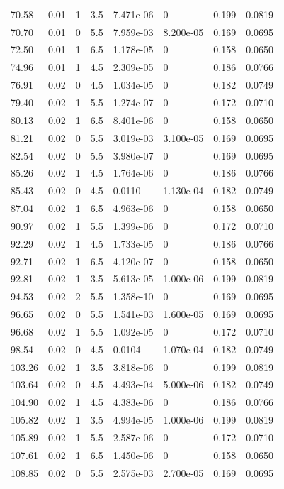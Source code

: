 \documentclass[preview]{standalone}
\begin{document}
{{{\begin{tabular}{L{1.2cm}C{1.2cm} C{0.3cm}C{0.5cm} C{1.4cm}C{1.4cm} C{1.4cm}C{1.4cm}}
  70.58  &  0.01  & 1     & 3.5 &  7.471e-06  & 0  & 0.199 &  0.0819   \\ 
  70.70  &  0.01  & 0     & 5.5 &  7.959e-03  & 8.200e-05  & 0.169 &  0.0695   \\ 
  72.50  &  0.01  & 1     & 6.5 &  1.178e-05  & 0  & 0.158 &  0.0650   \\ 
  74.96  &  0.01  & 1     & 4.5 &  2.309e-05  & 0  & 0.186 &  0.0766   \\ 
  76.91  &  0.02  & 0     & 4.5 &  1.034e-05  & 0  & 0.182 &  0.0749   \\ 
  79.40  &  0.02  & 1     & 5.5 &  1.274e-07  & 0  & 0.172 &  0.0710   \\ 
  80.13  &  0.02  & 1     & 6.5 &  8.401e-06  & 0  & 0.158 &  0.0650   \\ 
  81.21  &  0.02  & 0     & 5.5 &  3.019e-03  & 3.100e-05  & 0.169 &  0.0695   \\ 
  82.54  &  0.02  & 0     & 5.5 &  3.980e-07  & 0  & 0.169 &  0.0695   \\ 
  85.26  &  0.02  & 1     & 4.5 &  1.764e-06  & 0  & 0.186 &  0.0766   \\ 
  85.43  &  0.02  & 0     & 4.5 &  0.0110  & 1.130e-04  & 0.182 &  0.0749   \\ 
  87.04  &  0.02  & 1     & 6.5 &  4.963e-06  & 0  & 0.158 &  0.0650   \\ 
  90.97  &  0.02  & 1     & 5.5 &  1.399e-06  & 0  & 0.172 &  0.0710   \\ 
  92.29  &  0.02  & 1     & 4.5 &  1.733e-05  & 0  & 0.186 &  0.0766   \\ 
  92.71  &  0.02  & 1     & 6.5 &  4.120e-07  & 0  & 0.158 &  0.0650   \\ 
  92.81  &  0.02  & 1     & 3.5 &  5.613e-05  & 1.000e-06  & 0.199 &  0.0819   \\ 
  94.53  &  0.02  & 2     & 5.5 &  1.358e-10  & 0  & 0.169 &  0.0695   \\ 
  96.65  &  0.02  & 0     & 5.5 &  1.541e-03  & 1.600e-05  & 0.169 &  0.0695   \\ 
  96.68  &  0.02  & 1     & 5.5 &  1.092e-05  & 0  & 0.172 &  0.0710   \\ 
  98.54  &  0.02  & 0     & 4.5 &  0.0104  & 1.070e-04  & 0.182 &  0.0749   \\ 
  103.26  &  0.02  & 1     & 3.5 &  3.818e-06  & 0  & 0.199 &  0.0819   \\ 
  103.64  &  0.02  & 0     & 4.5 &  4.493e-04  & 5.000e-06  & 0.182 &  0.0749   \\ 
  104.90  &  0.02  & 1     & 4.5 &  4.383e-06  & 0  & 0.186 &  0.0766   \\ 
  105.82  &  0.02  & 1     & 3.5 &  4.994e-05  & 1.000e-06  & 0.199 &  0.0819   \\ 
  105.89  &  0.02  & 1     & 5.5 &  2.587e-06  & 0  & 0.172 &  0.0710   \\ 
  107.61  &  0.02  & 1     & 6.5 &  1.450e-06  & 0  & 0.158 &  0.0650   \\ 
  108.85  &  0.02  & 0     & 5.5 &  2.575e-03  & 2.700e-05  & 0.169 &  0.0695   \\ 
\hline 
\end{tabular} 

}}}
\end{document}
